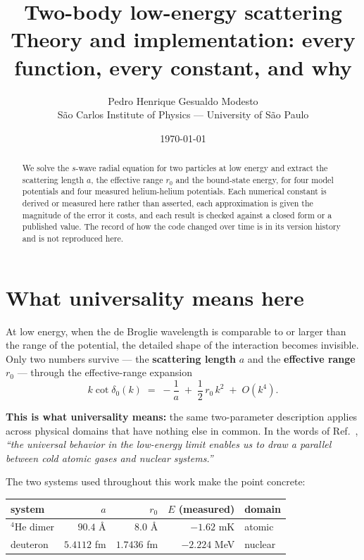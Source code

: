\documentclass[11pt,a4paper]{article}
\title{\vspace{-1.5cm}\textbf{Two-body low-energy scattering}\\[6pt]
       \large Theory and implementation: every function, every constant, and why}
\author{Pedro Henrique Gesualdo Modesto\\
        \small São Carlos Institute of Physics --- University of São Paulo}
\date{\today}
\begin{document}
\maketitle

\begin{abstract}
\noindent
We solve the $s$-wave radial equation for two particles at low energy and
extract the scattering length $a$, the effective range $r_0$ and the
bound-state energy, for four model potentials and four measured helium-helium
potentials. Each numerical constant is derived or measured here rather than
asserted, each approximation is given the magnitude of the error it costs, and
each result is checked against a closed form or a published value. The record
of how the code changed over time is in its version history and is not
reproduced here.
\end{abstract}

\tableofcontents
\newpage

\section{What universality means here}
\label{sec:universality}

At low energy, when the de Broglie wavelength is comparable to or larger than
the range of the potential, the detailed shape of the interaction becomes
invisible. Only two numbers survive --- the \textbf{scattering length} $a$ and
the \textbf{effective range} $r_0$ --- through the effective-range expansion
\begin{equation}
  k\cot\delta_0(k) \;=\; -\frac{1}{a} \;+\; \frac{1}{2}\,r_0\,k^2 \;+\; O(k^4).
  \label{eq:ere}
\end{equation}

\textbf{This is what universality means:} the same two-parameter description
applies across physical domains that have nothing else in common. In the words
of Ref.~\cite{rbef}, \emph{``the universal behavior in the low-energy limit
enables us to draw a parallel between cold atomic gases and nuclear systems.''}

The two systems used throughout this work make the point concrete:

\begin{center}
\begin{tabular}{lrrrl}
\toprule
system & $a$ & $r_0$ & $E$ (measured) & domain \\
\midrule
$^4$He dimer & $90.4$ \AA & $8.0$ \AA & $-1.62$ mK & atomic \\
deuteron & $5.4112$ fm & $1.7436$ fm & $-2.224$ MeV & nuclear \\
\bottomrule
\end{tabular}
\end{center}
\end{document}
